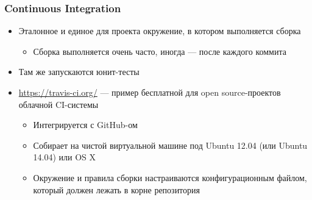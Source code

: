 \documentclass[xetex,mathserif,serif]{beamer}
\begin{document}
	\begin{frame}
		\frametitle{Continuous Integration}
		\begin{itemize}
			\item Эталонное и единое для проекта окружение, в котором выполняется сборка
			\begin{itemize}
				\item Сборка выполняется очень часто, иногда --- после каждого коммита
			\end{itemize}
			\item Там же запускаются юнит-тесты
			\item \url{https://travis-ci.org/} --- пример бесплатной для open source-проектов облачной CI-системы
			\begin{itemize}
				\item Интегрируется с GitHub-ом
				\item Собирает на чистой виртуальной машине под Ubuntu 12.04 (или Ubuntu 14.04) или OS X
				\item Окружение и правила сборки настраиваются конфигурационным файлом, который должен лежать в корне репозитория
			\end{itemize}
		\end{itemize}
	\end{frame}
\end{document}
